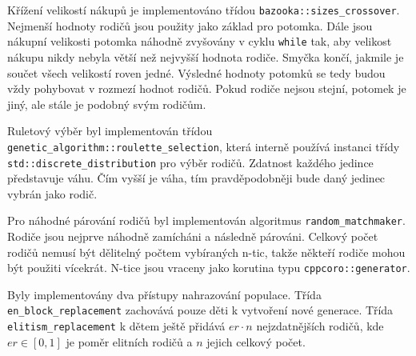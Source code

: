 Křížení velikostí nákupů je implementováno třídou \texttt{bazooka::sizes\_crossover}.
Nejmenší hodnoty rodičů jsou použity jako základ pro potomka.
Dále jsou nákupní velikosti potomka náhodně zvyšovány v cyklu \texttt{while} tak, aby velikost nákupu nikdy nebyla větší než nejvyšší hodnota rodiče.
Smyčka končí, jakmile je součet všech velikostí roven jedné.
Výsledné hodnoty potomků se tedy budou vždy pohybovat v rozmezí hodnot rodičů.
Pokud rodiče nejsou stejní, potomek je jiný, ale stále je podobný svým rodičům.

Ruletový výběr byl implementován třídou \texttt{genetic\_algorithm::roulette\_selection}, která interně používá instanci třídy \texttt{std::discrete\_distribution} pro výběr rodičů.
Zdatnost každého jedince představuje váhu.
Čím vyšší je váha, tím pravděpodobněji bude daný jedinec vybrán jako rodič.

Pro náhodné párování rodičů byl implementován algoritmus \texttt{random\_matchmaker}.
Rodiče jsou nejprve náhodně zamícháni a následně párováni.
Celkový počet rodičů nemusí být dělitelný počtem vybíraných n-tic, takže někteří rodiče mohou být použiti vícekrát.
N-tice jsou vraceny jako korutina typu \texttt{cppcoro::generator}.

Byly implementovány dva přístupy nahrazování populace.
Třída \texttt{en\_block\_replacement} zachovává pouze děti k vytvoření nové generace. Třída \texttt{elitism\_replacement} k dětem ještě přidává $er\cdot n$ nejzdatnějších rodičů, kde $er \in [0, 1]$ je poměr elitních rodičů a $n$ jejich celkový počet.

